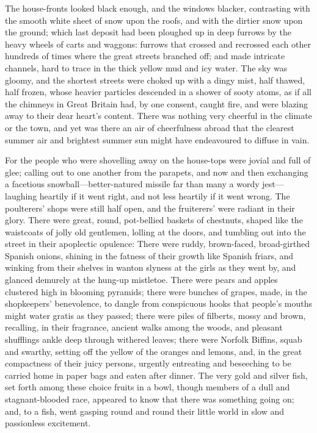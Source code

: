 The house-fronts looked black enough, and the windows black\-er, contrasting with the smooth white sheet of snow upon the roofs, and with the dirtier snow upon the ground; which last deposit had been ploughed up in deep furrows by the heavy wheels of carts and waggons: furrows that crossed and recrossed each other hundreds of times where the great streets branched off; and made intricate channels, hard to trace in the thick yellow mud and icy water. The sky was gloomy, and the shortest streets were choked up with a dingy mist, half thawed, half frozen, whose heavier particles descended in a shower of sooty atoms, as if all the chimneys in Great Britain had, by one consent, caught fire, and were blazing away to their dear heart's content. There was nothing very cheerful in the climate or the town, and yet was there an air of cheerfulness abroad that the clearest summer air and brightest summer sun might have endeavoured to diffuse in vain.

For the people who were shovelling away on the house-tops were jovial and full of glee; calling out to one another from the parapets, and now and then exchanging a facetious snowball---better-natured missile far than many a wordy jest---laughing heartily if it went right, and not less heartily if it went wrong. The poulterers' shops were still half open, and the fruiterers' were radiant in their glory. There were great, round, pot-bellied baskets of chestnuts, shaped like the waistcoats of jolly old gentlemen, lolling at the doors, and tumbling out into the street in their apoplectic opulence: There were ruddy, brown-faced, broad-girthed Spanish onions, shining in the fatness of their growth like Spanish friars, and winking from their shelves in wanton slyness at the girls as they went by, and glanced demurely at the hung-up mistletoe. There were pears and apples clustered high in blooming pyramids; there were bunches of grapes, made, in the shopkeepers' benevolence, to dangle from conspicuous hooks that people's  mouths might water gratis as they passed; there were piles of filberts, mossy and brown, recalling, in their fragrance, ancient walks among the woods, and pleasant shufflings ankle deep through withered leaves; there were Norfolk Biffins, squab and swarthy, setting off the yellow of the oranges and lemons, and, in the great compactness of their juicy persons, urgently entreating and beseeching to be carried home in paper bags and eaten after dinner. The very gold and silver fish, set forth among these choice fruits in a bowl, though members of a dull and stagnant-blooded race, appeared to know that there was something going on; and, to a fish, went gasping round and round their little world in slow and passionless excitement.

